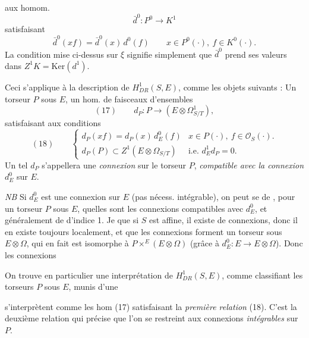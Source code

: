 \documentclass[11pt,a4paper]{article}
\begin{document}
aux homom.
\[
\bar d^0 : P^0 \longrightarrow K^1
\]
satisfaisant
\[
\bar d^0(xf) = \bar d^0(x)\, d^0(f) \qquad x \in P^0(\cdot),\ f \in K^0(\cdot) .
\]
La condition mise ci-dessus sur $\xi$ signifie simplement que $\bar d^0$ prend ses valeurs
dans $Z^1K = \mathrm{Ker}(d^1)$.

Ceci s'applique  à la description de $H^1_{DR}(S,E)$, comme
 les objets suivants : Un torseur $P$ sous $E$, un hom. de faisceaux
d'ensembles
\[
(17)\qquad d_P : P \longrightarrow (E \otimes \Omega^1_{S/T}) ,
\]
satisfaisant aux conditions
\[
(18)\qquad
\begin{cases}
d_P(xf) = d_P(x)\, d^0_E(f) & x \in P(\cdot),\ f \in \mathcal{O}_S(\cdot) . \\
d_P(P) \subset Z^1(E \otimes \Omega_{S/T}) & \text{i.e. } d^1_E d_P = 0 .
\end{cases}
\]
Un tel $d_P$ s'appellera une \emph{connexion}  sur le torseur $P$,
\emph{compatible avec la connexion}  $d^0_E$ sur $E$.

\emph{NB} Si $d^0_E$ est une connexion sur $E$ (pas nécess. intégrable),
\struck{\ill{}} on peut se  de , pour un torseur $P$ sous $E$,
quelles sont les connexions compatibles avec $d^0_E$, et 
généralement \struck{\ill{}} de \ill{} 
d'indice 1. Je  que si $S$ est affine, il existe
de  connexions, donc il en existe toujours localement,
et que les connexions forment un torseur sous
$E \otimes \Omega$, qui en fait est isomorphe à $P \times^E (E \otimes \Omega)$
(grâce à $d^0_E : E \to E \otimes \Omega$). Donc les connexions

On trouve en particulier une interprétation de $H^1_{DR}(S,E)$, comme classifiant les
torseurs $P$ sous $E$, munis d'une

s'interprètent comme les hom (17) satisfaisant la \emph{première relation} (18).
 C'est la deuxième relation qui précise que l'on se restreint aux
connexions \emph{intégrables} sur $P$.
\end{document}
